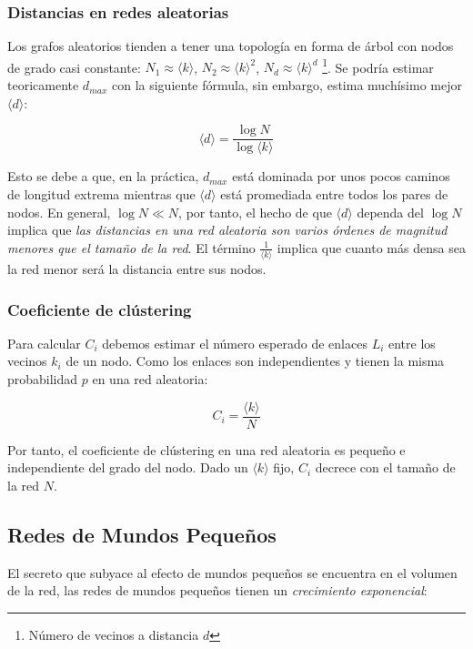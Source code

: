 \documentclass[10pt,spanish, landscape, twocolumn]{article}
\begin{document}
\subsubsection{\textcolor{temacinco}Distancias en redes aleatorias}
Los grafos aleatorios tienden a tener una topología en forma de árbol con nodos de grado casi constante: $N_{1} \approx \langle k \rangle$, $N_2 \approx \langle k \rangle^2$, $N_d \approx \langle k \rangle^d$ \footnote{Número de vecinos a distancia $d$}. Se podría estimar teoricamente $d_{max}$ con la siguiente fórmula, sin embargo, estima muchísimo mejor $\langle d \rangle$:

\begin{displaymath}
    \langle d \rangle = \frac{\log N}{\log \langle k \rangle}
\end{displaymath}

Esto se debe a que, en la práctica, $d_{max}$ está dominada por unos pocos caminos de longitud extrema mientras que $\langle d \rangle$ está promediada entre todos los pares de nodos. En general, $\log N \ll N$, por tanto, el hecho de que $\langle d \rangle$ dependa del $\log N$ implica que \textit{\textcolor{temacinco}{las distancias en una red aleatoria son varios órdenes de magnitud menores que el tamaño de la red}}. El término $\frac{1}{\langle k \rangle}$ implica que cuanto más densa sea la red menor será la distancia entre sus nodos.

\subsubsection{\textcolor{temacinco}Coeficiente de clústering}
Para calcular $C_i$ debemos estimar el número esperado de enlaces $L_i$ entre los vecinos $k_i$ de un nodo. Como los enlaces son independientes y tienen la misma probabilidad $p$ en una red aleatoria:

\begin{displaymath}
    C_i = \frac{\langle k \rangle}{N}
\end{displaymath}

Por tanto, el coeficiente de clústering en una red aleatoria es pequeño e independiente del grado del nodo. Dado un $\langle k \rangle$ fijo, $C_i$ decrece con el tamaño de la red $N$.

\subsection{\textcolor{temacinco}Redes de Mundos Pequeños}
El secreto que subyace al efecto de mundos pequeños se encuentra en el volumen de la red, las redes de mundos pequeños tienen un \textit{\textcolor{temacinco}{crecimiento exponencial}}:
\end{document}
